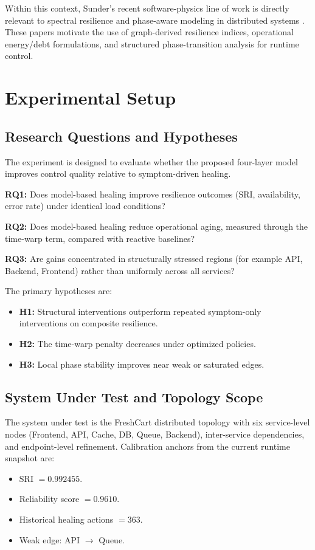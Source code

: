 \documentclass[conference]{IEEEtran}
\begin{document}
Within this context, Sunder's recent software-physics line of work is directly relevant to spectral resilience and phase-aware modeling in distributed systems \cite{sunder2025spectral,sunder2026fem,sunder2026part2,sunder2026unified}. These papers motivate the use of graph-derived resilience indices, operational energy/debt formulations, and structured phase-transition analysis for runtime control.

\section{Experimental Setup}
\subsection{Research Questions and Hypotheses}
The experiment is designed to evaluate whether the proposed four-layer model improves control quality relative to symptom-driven healing.

\textbf{RQ1:} Does model-based healing improve resilience outcomes (SRI, availability, error rate) under identical load conditions?

\textbf{RQ2:} Does model-based healing reduce operational aging, measured through the time-warp term, compared with reactive baselines?

\textbf{RQ3:} Are gains concentrated in structurally stressed regions (for example API, Backend, Frontend) rather than uniformly across all services?

The primary hypotheses are:
\begin{itemize}
\item \textbf{H1:} Structural interventions outperform repeated symptom-only interventions on composite resilience.
\item \textbf{H2:} The time-warp penalty decreases under optimized policies.
\item \textbf{H3:} Local phase stability improves near weak or saturated edges.
\end{itemize}

\subsection{System Under Test and Topology Scope}
The system under test is the FreshCart distributed topology with six service-level nodes (Frontend, API, Cache, DB, Queue, Backend), inter-service dependencies, and endpoint-level refinement. Calibration anchors from the current runtime snapshot are:
\begin{itemize}
\item SRI $=0.992455$.
\item Reliability score $=0.9610$.
\item Historical healing actions $=363$.
\item Weak edge: API $\rightarrow$ Queue.
\end{itemize}
\end{document}
